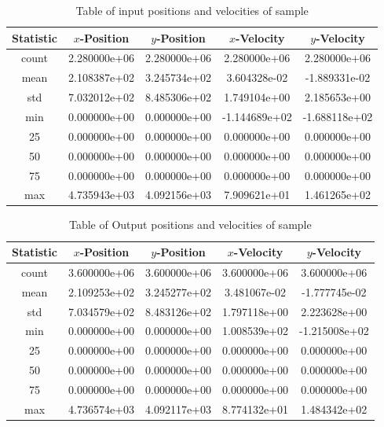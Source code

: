 \documentclass{article}
\begin{document}
        \begin{table}[h!]
            \centering
            \begin{tabular}{|| c | c c c c||} 
            \hline
            Statistic & $x$-Position & $y$-Position & $x$-Velocity & $y$-Velocity\\ [0.5ex] 
            \hline\hline
            count &	2.280000e+06 & 2.280000e+06 & 2.280000e+06 & 2.280000e+06\\
            mean & 2.108387e+02 & 3.245734e+02 & 3.604328e-02 & -1.889331e-02\\
            std & 7.032012e+02 & 8.485306e+02 & 1.749104e+00 & 2.185653e+00\\
            min & 0.000000e+00 & 0.000000e+00 & -1.144689e+02 & -1.688118e+02\\
            25 & 0.000000e+00 & 0.000000e+00 & 0.000000e+00 & 0.000000e+00\\
            50 & 0.000000e+00 & 0.000000e+00 & 0.000000e+00 & 0.000000e+00\\
            75 & 0.000000e+00 & 0.000000e+00 & 0.000000e+00 & 0.000000e+00\\
            max & 4.735943e+03 & 4.092156e+03 & 7.909621e+01 & 1.461265e+02\\
            \hline
            \end{tabular}
            \caption{Table of input positions and velocities of sample}
            \label{table:1}
        \end{table}
        
        \begin{table}[h!]
            \centering
            \begin{tabular}{|| c | c c c c||} 
            \hline
            Statistic & $x$-Position & $y$-Position & $x$-Velocity & $y$-Velocity\\ [0.5ex] 
            \hline\hline
            count & 3.600000e+06 & 3.600000e+06 & 3.600000e+06 & 3.600000e+06\\
            mean & 2.109253e+02 & 3.245277e+02 & 3.481067e-02 & -1.777745e-02\\
            std & 7.034579e+02 & 8.483126e+02 & 1.797118e+00 & 2.223628e+00\\
            min & 0.000000e+00 & 0.000000e+00  & 1.008539e+02 & -1.215008e+02\\
            25 & 	0.000000e+00 & 0.000000e+00 & 0.000000e+00 & 0.000000e+00\\
            50 & 	0.000000e+00 & 0.000000e+00 & 0.000000e+00 & 0.000000e+00\\
            75 & 	0.000000e+00 & 0.000000e+00 & 0.000000e+00 & 0.000000e+00\\
            max & 4.736574e+03 & 4.092117e+03 & 8.774132e+01 & 1.484342e+02\\
            \hline
            \end{tabular}
            \caption{Table of Output positions and velocities of sample}
            \label{table:2}
        \end{table}
\end{document}
